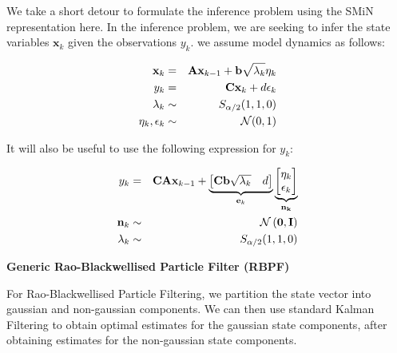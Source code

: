 \documentclass[../main.tex]{subfiles}
\begin{document}
We take a short detour to formulate the inference problem using the SMiN representation here. In the inference problem, we are seeking to infer the state variables $\mathbf{x}_{k}$ given the observations $y_{k}$. we assume model dynamics as follows:

\begin{eqnarray}
    \mathbf{x}_k & = & \mathbf{A} \mathbf{x}_{k-1} + \mathbf{b} \sqrt{\lambda_k} \eta_k \notag \\
    y_k  & = & \mathbf{C} \mathbf{x}_k + d \epsilon_k \\
    \lambda_k & \sim & S_{\alpha / 2}(1,1,0) \notag \\
    \eta_k, \epsilon_k & \sim & \mathcal{N}(0,1) \notag
    \label{eq:2_2_2_model_dynamics} 
\end{eqnarray}

It will also be useful to use the following expression for $y_k$:

\begin{eqnarray}
    y_k & = & \mathbf{CA} \mathbf{x}_{k-1} + \underbrace{
        \begin{bmatrix}
            \mathbf{Cb} \sqrt{\lambda_k} & d
        \end{bmatrix}
    }_{\mathbf{e}_k} \underbrace{
        \begin{bmatrix}
        \eta_k \\ \epsilon_k
        \end{bmatrix}
    }_{\mathbf{n_k}} \\
    \mathbf{n}_k & \sim & \mathcal{N} \left(
        \mathbf{0}
        , \mathbf{I} \right) \notag \\
    \lambda_k & \sim & S_{\alpha / 2}(1,1,0) \notag
    \label{eq:2_2_2_model_dynamics_y} 
\end{eqnarray}


\textbf{Generic Rao-Blackwellised Particle Filter (RBPF)}

For Rao-Blackwellised Particle Filtering, we partition the state vector into gaussian and non-gaussian components. We can then use standard Kalman Filtering to obtain optimal estimates for the gaussian state components, after obtaining estimates for the non-gaussian state components.  
\end{document}
